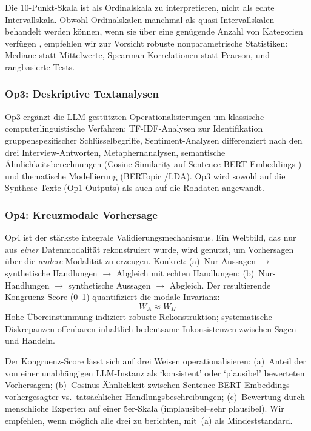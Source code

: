 \documentclass[11pt,a4paper]{article}
\theoremstyle{definition}
\theoremstyle{plain}
\theoremstyle{remark}
\begin{document}
Die 10-Punkt-Skala ist als Ordinalskala zu interpretieren, nicht als echte Intervallskala. Obwohl Ordinalskalen manchmal als quasi-Intervallskalen behandelt werden k\"onnen, wenn sie \"uber eine gen\"ugende Anzahl von Kategorien verf\"ugen \citep{Norman2010}, empfehlen wir zur Vorsicht robuste nonparametrische Statistiken: Mediane statt Mittelwerte, Spearman-Korrelationen statt Pearson, und rangbasierte Tests.

\subsubsection{Op3: Deskriptive Textanalysen}

Op3 erg\"anzt die LLM-gest\"utzten Operationalisierungen um klassische computerlinguistische Verfahren: TF-IDF-Analysen zur Identifikation gruppenspezifischer Schl\"usselbegriffe, Sentiment-Analysen differenziert nach den drei Interview-Antworten, Metaphernanalysen, semantische \"Ahnlichkeitsberechnungen (Cosine Similarity auf Sentence-BERT-Embeddings \citealp{Reimers2019}) und thematische Modellierung (BERTopic \citealp{Grootendorst2022}/LDA). Op3 wird sowohl auf die Synthese-Texte (Op1-Outputs) als auch auf die Rohdaten angewandt.

\subsubsection{Op4: Kreuzmodale Vorhersage}

Op4 ist der st\"arkste integrale Validierungsmechanismus. Ein Weltbild, das nur aus \emph{einer} Datenmodalit\"at rekonstruiert wurde, wird genutzt, um Vorhersagen \"uber die \emph{andere} Modalit\"at zu erzeugen. Konkret: (a)~Nur-Aussagen $\rightarrow$ synthetische Handlungen $\rightarrow$ Abgleich mit echten Handlungen; (b)~Nur-Handlungen $\rightarrow$ synthetische Aussagen $\rightarrow$ Abgleich. Der resultierende Kongruenz-Score (0--1) quantifiziert die modale Invarianz:
\begin{equation}
  W_A \approx W_H
\end{equation}
Hohe \"Ubereinstimmung indiziert robuste Rekonstruktion; systematische Diskrepanzen offenbaren inhaltlich bedeutsame Inkonsistenzen zwischen Sagen und Handeln.

Der Kongruenz-Score l\"asst sich auf drei Weisen operationalisieren: (a)~Anteil der von einer unabh\"angigen LLM-Instanz als `konsistent' oder `plausibel' bewerteten Vorhersagen; (b)~Cosinus-\"Ahnlichkeit zwischen Sentence-BERT-Embeddings vorhergesagter vs.~tats\"achlicher Handlungsbeschreibungen; (c)~Bewertung durch menschliche Experten auf einer 5er-Skala (implausibel--sehr plausibel). Wir empfehlen, wenn m\"oglich alle drei zu berichten, mit~(a) als Mindeststandard.
\end{document}
